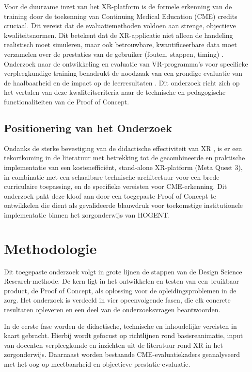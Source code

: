 Voor de duurzame inzet van het XR-platform is de formele erkenning van de training door de toekenning van Continuing Medical Education (CME) credits cruciaal. Dit vereist dat de evaluatiemethoden voldoen aan strenge, objectieve kwaliteitsnormen. Dit betekent dat de XR-applicatie niet alleen de handeling realistisch moet simuleren, maar ook betrouwbare, kwantificeerbare data moet verzamelen over de prestaties van de gebruiker (fouten, stappen, timing) \autocite{Radianti2020}. Onderzoek naar de ontwikkeling en evaluatie van VR-programma's voor specifieke verpleegkundige training benadrukt de noodzaak van een grondige evaluatie van de haalbaarheid en de impact op de leerresultaten \autocite{Hung2024}. Dit onderzoek richt zich op het vertalen van deze kwaliteitscriteria naar de technische en pedagogische functionaliteiten van de Proof of Concept.

\subsection{Positionering van het Onderzoek}

Ondanks de sterke bevestiging van de didactische effectiviteit van XR \autocite{Lampropoulos2025}, is er een tekortkoming in de literatuur met betrekking tot de gecombineerde en praktische implementatie van een kostenefficiënt, stand-alone XR-platform (Meta Quest 3), in combinatie met een schaalbare technische architectuur voor een brede curriculaire toepassing, en de specifieke vereisten voor CME-erkenning. Dit onderzoek pakt deze kloof aan door een toegepaste Proof of Concept te ontwikkelen die dient als gevalideerde blauwdruk voor toekomstige institutionele implementatie binnen het zorgonderwijs van HOGENT.
\section{Methodologie}%
\label{sec:methodologie}

Dit toegepaste onderzoek volgt in grote lijnen de stappen van de Design Science Research-methode. De kern ligt in het ontwikkelen en testen van een bruikbaar product, de Proof of Concept, als oplossing voor de opleidingsproblemen in de zorg. Het onderzoek is verdeeld in vier opeenvolgende fasen, die elk concrete resultaten opleveren en een deel van de onderzoeksvragen beantwoorden.

In de eerste fase worden de didactische, technische en inhoudelijke vereisten in kaart gebracht. Hierbij wordt gefocust op richtlijnen rond basisreanimatie, input van docenten verpleegkunde en inzichten uit de literatuur rond XR in het zorgonderwijs. Daarnaast worden bestaande CME-evaluatiekaders geanalyseerd met het oog op meetbaarheid en objectieve prestatie-evaluatie.

